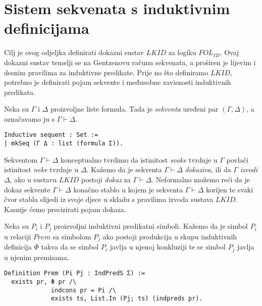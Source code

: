 \chapter{Sistem sekvenata s induktivnim definicijama}\label{sec:sistem-sekvenata}
Cilj je ovog odjeljka definirati dokazni sustav \(\mathit{LKID}\) za logiku \(\mathit{FOL_{ID}}\).
Ovaj dokazni sustav temelji se na Gentzenovu računu sekvenata, a proširen je lijevim i desnim pravilima za induktivne predikate.
Prije no što definiramo \(\mathit{LKID}\), potrebno je definirati pojam sekvente i međusobne zavisnosti induktivnih predikata.

\begin{definition}
  Neka su \(\Gamma\) i \(\Delta\) proizvoljne liste formula.
  Tada je \textit{sekventa} uređeni par \((\Gamma,\Delta)\), a označavamo ju s \(\Gamma \vdash \Delta\).
\begin{verbatim}
Inductive sequent : Set :=
| mkSeq (Γ Δ : list (formula Σ)).
\end{verbatim}
\end{definition}
\noindent Sekventom \(\Gamma \vdash \Delta\) konceptualno tvrdimo da istinitost \textit{svake}
tvrdnje u \(\Gamma\) povlači istinitost \textit{neke} tvrdnje u \(\Delta\).
Kažemo da je sekventa \(\Gamma \vdash \Delta\) \textit{dokaziva}, ili da \(\Gamma\) \textit{izvodi} \(\Delta\), ako u sustavu \(\mathit{LKID}\) postoji \textit{dokaz} za \(\Gamma \vdash \Delta\).
Neformalno možemo reći da je dokaz sekvente \(\Gamma \vdash \Delta\) konačno stablo u kojem je sekventa \(\Gamma \vdash \Delta\) korijen
te svaki čvor stabla slijedi iz svoje djece u skladu s pravilima izvoda sustava \(\mathit{LKID}\).
Kasnije ćemo precizirati pojam dokaza.

\begin{definition}
  Neka su \(P_{i}\) i \(P_{j}\) proizvoljni induktivni predikatni simboli.
  Kažemo da je simbol \(P_{i}\) u relaciji \(\mathit{Prem}\) sa simbolom \(P_{j}\)
  ako postoji produkcija u skupu induktivnih definicija \(\Phi\) takva da
  se simbol \(P_{i}\) javlja u njenoj konkluziji te
  se simbol \(P_{j}\) javlja u njenim premisama.
\begin{verbatim}
Definition Prem (Pi Pj : IndPredS Σ) :=
  exists pr, Φ pr /\
             indcons pr = Pi /\
             exists ts, List.In (Pj; ts) (indpreds pr).
\end{verbatim}
\end{definition}

